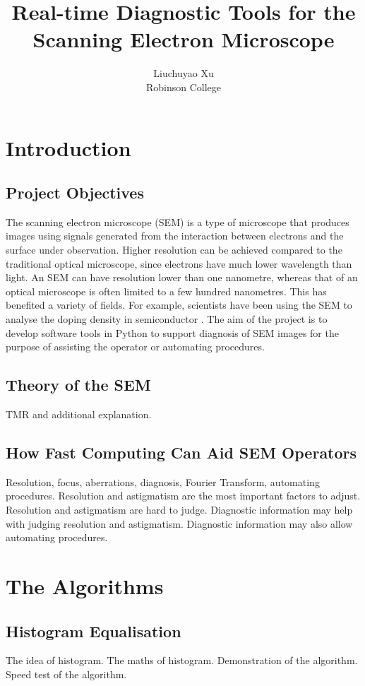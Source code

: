 \documentclass{article}
\title{Real-time Diagnostic Tools for the Scanning Electron Microscope}
\author{Liuchuyao Xu\\Robinson College}
\begin{document}
\maketitle
\tableofcontents
\newpage

\section{Introduction}
\subsection{Project Objectives}
The scanning electron microscope (SEM) is a type of microscope that produces images using signals generated from the interaction between electrons and the surface under observation. Higher resolution can be achieved compared to the traditional optical microscope, since electrons have much lower wavelength than light. An SEM can have resolution lower than one nanometre, whereas that of an optical microscope is often limited to a few hundred nanometres. This has benefited a variety of fields. For example, scientists have been using the SEM to analyse the doping density in semiconductor \cite{SEM for semiconductor}. The aim of the project is to develop software tools in Python to support diagnosis of SEM images for the purpose of assisting the operator or automating procedures.

\subsection{Theory of the SEM}
TMR and additional explanation.

\subsection{How Fast Computing Can Aid SEM Operators}
Resolution, focus, aberrations, diagnosis, Fourier Transform, automating procedures.
Resolution and astigmatism are the most important factors to adjust.
Resolution and astigmatism are hard to judge.
Diagnostic information may help with judging resolution and astigmatism.
Diagnostic information may also allow automating procedures.

\section{The Algorithms}
\subsection{Histogram Equalisation}
The idea of histogram.
The maths of histogram.
Demonstration of the algorithm.
Speed test of the algorithm.
\end{document}
